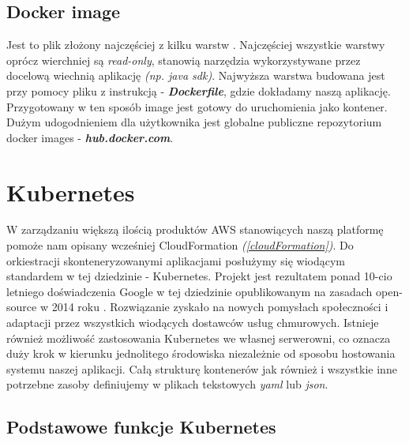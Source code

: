 \subsection{Docker image}
Jest to plik złożony najczęściej z kilku warstw \cite{docker-doc}. 
Najczęściej wszystkie warstwy oprócz wierchniej są \emph{read-only}, stanowią narzędzia wykorzystywane przez docelową wiechnią aplikację \emph{(np. java sdk)}.
Najwyższa warstwa budowana jest przy pomocy pliku z instrukcją - \emph{\textbf{Dockerfile}}, gdzie dokładamy naszą aplikację.
Przygotowany w ten sposób image jest gotowy do uruchomienia jako kontener. Dużym udogodnieniem dla użytkownika jest globalne publiczne repozytorium docker images - \emph{\textbf{hub.docker.com}}.


\section{Kubernetes}
W zarządzaniu większą ilością produktów AWS stanowiących naszą platformę pomoże nam opisany wcześniej CloudFormation \emph{(\ref{cloudFormation})}. 
Do orkiestracji skonteneryzowanymi aplikacjami posłużymy się wiodącym standardem w tej dziedzinie - Kubernetes.
Projekt jest rezultatem ponad 10-cio letniego doświadczenia Google w tej dziedzinie opublikowanym na zasadach open-source w 2014 roku \cite{k8s-what}.
Rozwiązanie zyskało na nowych pomysłach społeczności i adaptacji przez wszystkich wiodących dostawców usług chmurowych.
Istnieje również możliwość zastosowania Kubernetes we własnej serwerowni, 
co oznacza duży krok w kierunku jednolitego środowiska niezależnie od sposobu hostowania systemu naszej aplikacji.
Całą strukturę kontenerów jak również i wszystkie inne potrzebne zasoby definiujemy w plikach tekstowych {\em yaml} lub {\em json}.

\subsection{Podstawowe funkcje Kubernetes}

